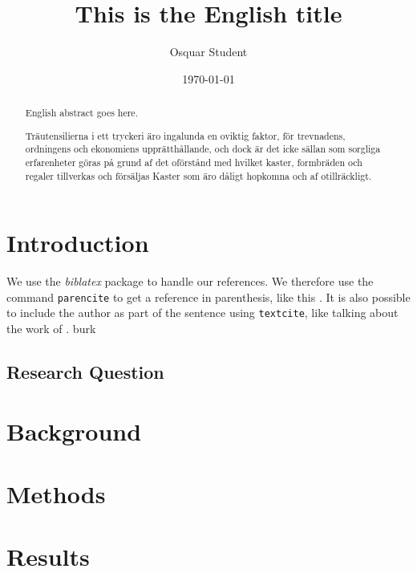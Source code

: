 \documentclass{kththesis}
\title{This is the English title}
\author{Osquar Student}
\date{\today}
\begin{document}
\frontmatter

\titlepage

\begin{abstract}
  English abstract goes here.

  \blindtext
\end{abstract}


\begin{otherlanguage}{swedish}
  \begin{abstract}
    Träutensilierna i ett tryckeri äro ingalunda en oviktig faktor,
    för trevnadens, ordningens och ekonomiens upprätthållande, och
    dock är det icke sällan som sorgliga erfarenheter göras på grund
    af det oförstånd med hvilket kaster, formbräden och regaler
    tillverkas och försäljas Kaster som äro dåligt hopkomna och af
    otillräckligt.
  \end{abstract}
\end{otherlanguage}


\tableofcontents


\mainmatter


\chapter{Introduction}

We use the \emph{biblatex} package to handle our references.  We therefore use the
command \texttt{parencite} to get a reference in parenthesis, like this
\parencite{heisenberg2015}.  It is also possible to include the author
as part of the sentence using \texttt{textcite}, like talking about
the work of \textcite{einstein2016}. burk

\Blindtext

\section{Research Question}
\blindtext

\chapter{Background}
\blindtext

\chapter{Methods}
\blindtext

\chapter{Results}
\blindtext
\end{document}
